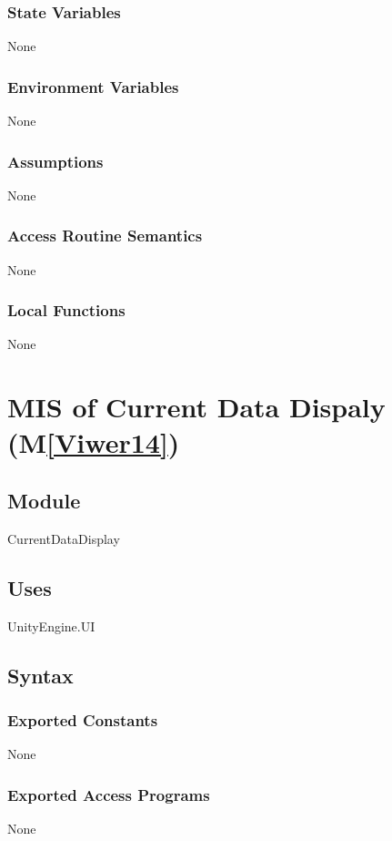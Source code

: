\documentclass[12pt, titlepage]{article}
\newcommand{\mref}[1]{M\ref{#1}}
\begin{document}
\subsubsection{State Variables}
None
\subsubsection{Environment Variables}
None
\subsubsection{Assumptions}
None
\subsubsection{Access Routine Semantics}
None
\subsubsection{Local Functions}
None

\newpage


\newcommand{\tref}{\href{https://docs.unity3d.com/Packages/com.unity.ugui@1.0/manual/script-Text.html}{here}}

\section{MIS of Current Data Dispaly (\mref{Viwer14})} 

\subsection{Module}
CurrentDataDisplay

\subsection{Uses}
UnityEngine.UI 

\subsection{Syntax}
\subsubsection{Exported Constants}
None
\subsubsection{Exported Access Programs}
None
\end{document}
